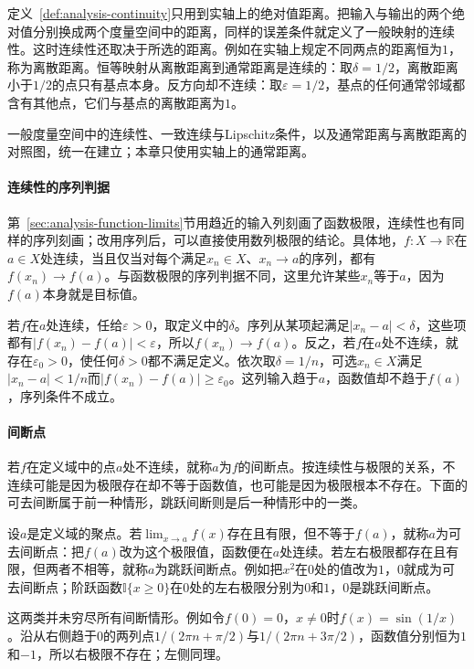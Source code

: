 定义~\ref{def:analysis-continuity}只用到实轴上的绝对值距离。把输入与输出的两个绝对值分别换成两个度量空间中的距离，同样的误差条件就定义了一般映射的连续性。这时连续性还取决于所选的距离。例如在实轴上规定不同两点的距离恒为$1$，称为离散距离。恒等映射从离散距离到通常距离是连续的：取$\delta=1/2$，离散距离小于$1/2$的点只有基点本身。反方向却不连续：取$\varepsilon=1/2$，基点的任何通常邻域都含有其他点，它们与基点的离散距离为$1$。

一般度量空间中的连续性、一致连续与Lipschitz条件，以及通常距离与离散距离的对照图，统一在建立；本章只使用实轴上的通常距离。

\paragraph{连续性的序列判据}
第~\ref{sec:analysis-function-limits}节用趋近的输入列刻画了函数极限，连续性也有同样的序列刻画；改用序列后，可以直接使用数列极限的结论。具体地，$f:X\to\mathbb R$在$a\in X$处连续，当且仅当对每个满足$x_n\in X$、$x_n\to a$的序列，都有$f(x_n)\to f(a)$。与函数极限的序列判据不同，这里允许某些$x_n$等于$a$，因为$f(a)$本身就是目标值。

若$f$在$a$处连续，任给$\varepsilon>0$，取定义中的$\delta$。序列从某项起满足$|x_n-a|<\delta$，这些项都有$|f(x_n)-f(a)|<\varepsilon$，所以$f(x_n)\to f(a)$。反之，若$f$在$a$处不连续，就存在$\varepsilon_0>0$，使任何$\delta>0$都不满足定义。依次取$\delta=1/n$，可选$x_n\in X$满足$|x_n-a|<1/n$而$|f(x_n)-f(a)|\geq\varepsilon_0$。这列输入趋于$a$，函数值却不趋于$f(a)$，序列条件不成立。

\paragraph{间断点}
若$f$在定义域中的点$a$处不连续，就称$a$为$f$的间断点。按连续性与极限的关系，不连续可能是因为极限存在却不等于函数值，也可能是因为极限根本不存在。下面的可去间断属于前一种情形，跳跃间断则是后一种情形中的一类。

设$a$是定义域的聚点。若$\lim_{x\to a}f(x)$存在且有限，但不等于$f(a)$，就称$a$为可去间断点：把$f(a)$改为这个极限值，函数便在$a$处连续。若左右极限都存在且有限，但两者不相等，就称$a$为跳跃间断点。例如把$x^2$在$0$处的值改为$1$，$0$就成为可去间断点；阶跃函数$\mathbb I\{x\geq0\}$在$0$处的左右极限分别为$0$和$1$，$0$是跳跃间断点。

这两类并未穷尽所有间断情形。例如令$f(0)=0$，$x\neq0$时$f(x)=\sin(1/x)$。沿从右侧趋于$0$的两列点$1/(2\pi n+\pi/2)$与$1/(2\pi n+3\pi/2)$，函数值分别恒为$1$和$-1$，所以右极限不存在；左侧同理。


